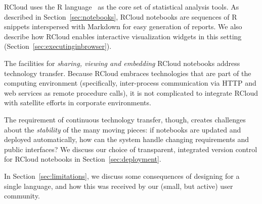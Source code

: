 RCloud uses the R language~\cite{RCoreTeam:2013:R} as the core set
of statistical analysis tools. As described in Section~\ref{sec:notebooks},
RCloud notebooks are sequences of R snippets interspersed with Markdown
for easy generation of reports. We also describe how RCloud enables
interactive visualization widgets in this setting (Section~\ref{sec:executinginbrowser}).

%

The facilities for \emph{sharing, viewing and embedding} RCloud
notebooks address technology transfer.
Because RCloud embraces technologies that are part of the computing
environment (specifically, inter-process communication via HTTP and
web services as remote procedure calls), it is not complicated to
integrate RCloud with satellite efforts in corporate environments.

The requirement of continuous technology transfer, though, creates challenges
about the \emph{stability} of the many moving pieces: if notebooks are
updated and deployed automatically, how can the system handle
changing requirements and public interfaces? We discuss our choice of
transparent, integrated version control for RCloud notebooks in 
Section~\ref{sec:deployment}.

In Section~\ref{sec:limitations}, we discuss some consequences of
designing for a single language, and how this was received by
our (small, but active) user community.





